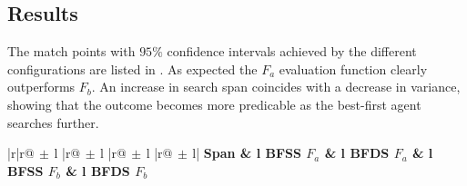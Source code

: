 \subsection*{Results}
The match points with $95\%$ confidence intervals achieved by the different configurations are listed in .  As expected the $F_a$ evaluation function clearly outperforms $F_b$. An increase in search span coincides with a decrease in variance, showing that the outcome becomes more predicable as the best-first agent searches further. 
\begin{table}[ht!]
	\caption{The performance of BFSS and BFDS against random}
	\centering
	\small
		\begin{tabular}{|r|r@{$\,\pm\,$}l
											|r@{$\,\pm\,$}l
											|r@{$\,\pm\,$}l
											|r@{$\,\pm\,$}l|}
		\hline
		\bf Span &  l {\bf BFSS $F_a$}\vline   
						 &  l {\bf BFDS $F_a$}\vline   
			       &  l {\bf BFSS $F_b$}\vline   
			       &  l {\bf BFDS $F_b$}\vline  
			       \\
				       

\end{tabular}
\end{table}
